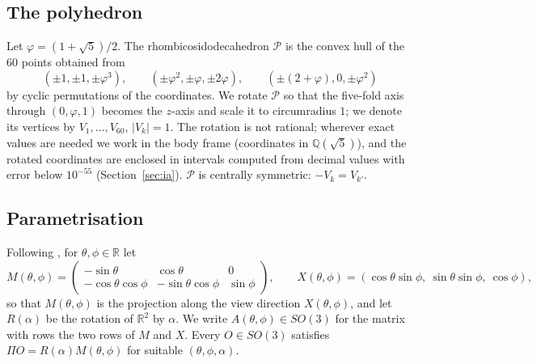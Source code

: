 \documentclass[11pt]{amsart}
\theoremstyle{definition}
\newcommand{\R}{\mathbb{R}}
\newcommand{\Q}{\mathbb{Q}}
\newcommand{\sq}{\sqrt5}
\newcommand{\gr}{\varphi}          %
\newcommand{\Prj}{\Pi}
\newcommand{\abs}[1]{\lvert #1\rvert}
\newcommand{\RID}{\mathcal{P}}
\begin{document}
\subsection{The polyhedron}
Let $\gr=(1+\sq)/2$. The rhombicosidodecahedron $\RID$ is the convex hull of the $60$ points obtained from
\[
(\pm1,\pm1,\pm\gr^3),\qquad (\pm\gr^2,\pm\gr,\pm2\gr),\qquad (\pm(2+\gr),0,\pm\gr^2)
\]
by cyclic permutations of the coordinates. We rotate $\RID$ so that the five-fold axis through $(0,\gr,1)$ becomes the
$z$-axis and scale it to circumradius $1$; we denote its vertices by $V_1,\dots,V_{60}$, $\abs{V_k}=1$. The rotation is
not rational; wherever exact values are needed we work in the body frame (coordinates in $\Q(\sq)$), and the rotated
coordinates are enclosed in intervals computed from decimal values with error below $10^{-55}$ (Section~\ref{sec:ia}). $\RID$ is
centrally symmetric: $-V_k=V_{k'}$.

\subsection{Parametrisation}
Following \cite{SY25}, for $\theta,\phi\in\R$ let
\[
M(\theta,\phi)=\begin{pmatrix}-\sin\theta&\cos\theta&0\\-\cos\theta\cos\phi&-\sin\theta\cos\phi&\sin\phi\end{pmatrix},
\qquad X(\theta,\phi)=(\cos\theta\sin\phi,\ \sin\theta\sin\phi,\ \cos\phi),
\]
so that $M(\theta,\phi)$ is the projection along the view direction $X(\theta,\phi)$, and let $R(\alpha)$ be the
rotation of $\R^2$ by $\alpha$. We write $A(\theta,\phi)\in SO(3)$ for the matrix with rows the two rows of $M$ and
$X$. Every $O\in SO(3)$ satisfies $\Prj O = R(\alpha)M(\theta,\phi)$ for suitable $(\theta,\phi,\alpha)$.
\end{document}
